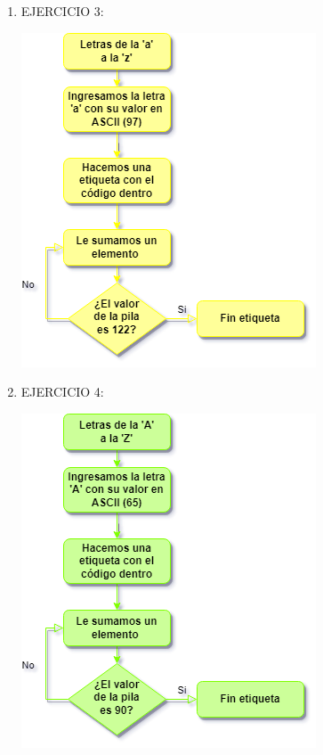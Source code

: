 \documentclass[conference]{IEEEtran}
\begin{document}
\begin{enumerate}
\begin{center}
	\end{center}
\newpage	
	\item  EJERCICIO 3:\\
	\begin{center}
	\includegraphics{diagrama3} \\
	\end{center}
\newpage	
	\item  EJERCICIO 4:\\
	\begin{center}
	\includegraphics{diagrama4} \\
	\end{center}
	

\end{enumerate}
\end{document}
